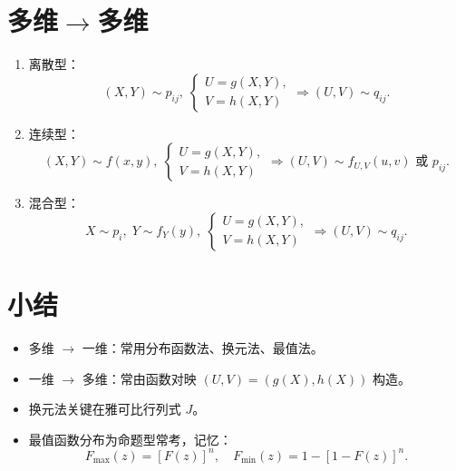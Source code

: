 \section{多维$\rightarrow$多维}

\begin{enumerate}
      \item 离散型：
            $$
                  (X,Y)\sim p_{ij},\;
                  \begin{cases}U=g(X,Y),\\V=h(X,Y)\end{cases}
                  \Rightarrow (U,V)\sim q_{ij}.
            $$
      \item 连续型：
            $$
                  (X,Y)\sim f(x,y),\;
                  \begin{cases}U=g(X,Y),\\V=h(X,Y)\end{cases}
                  \Rightarrow (U,V)\sim f_{U,V}(u,v)\text{ 或 }p_{ij}.
            $$
      \item 混合型：
            $$
                  X\sim p_i,\;Y\sim f_Y(y),\;
                  \begin{cases}U=g(X,Y),\\V=h(X,Y)\end{cases}
                  \Rightarrow (U,V)\sim q_{ij}.
            $$
\end{enumerate}


\section*{小结}
\begin{itemize}
      \item 多维 $\to$ 一维：常用分布函数法、换元法、最值法。
      \item 一维 $\to$ 多维：常由函数对映 $(U,V)=(g(X),h(X))$ 构造。
      \item 换元法关键在雅可比行列式 $J$。
      \item 最值函数分布为命题型常考，记忆：
            $$F_{\max}(z)=[F(z)]^n,\quad F_{\min}(z)=1-[1-F(z)]^n.$$
\end{itemize}